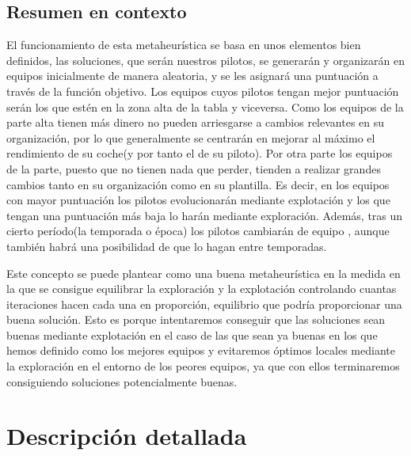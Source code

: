 \documentclass{article}
\begin{document}
	\subsection{Resumen en contexto}
	\indent El funcionamiento de esta metaheurística se basa en unos elementos bien definidos, las soluciones, que serán nuestros pilotos, se generarán y organizarán en equipos inicialmente de manera aleatoria, y se les asignará una puntuación a través de la función objetivo. Los equipos cuyos pilotos tengan mejor puntuación serán los que estén en la zona alta de la tabla y viceversa. Como los equipos de la parte alta tienen más dinero no pueden arriesgarse a cambios relevantes en su organización, por lo que generalmente se centrarán en mejorar al máximo el rendimiento de su coche(y por tanto el de su piloto). Por otra parte los equipos de la parte, puesto que no tienen nada que perder, tienden a realizar grandes cambios tanto en su organización como en su plantilla. Es decir, en los equipos con mayor puntuación los pilotos evolucionarán mediante explotación y los que tengan una puntuación más baja lo harán mediante exploración. Además, tras un cierto período(la temporada o época) los pilotos cambiarán de equipo , aunque también habrá una posibilidad de que lo hagan entre temporadas.
	\par
	Este concepto se puede plantear como una buena metaheurística en la medida en la que se consigue equilibrar la exploración y la explotación controlando cuantas iteraciones hacen cada una en proporción, equilibrio que podría proporcionar una buena solución. Esto es porque intentaremos conseguir que las soluciones sean buenas mediante explotación en el caso de las que sean ya buenas en los que hemos definido como los mejores equipos y evitaremos óptimos locales mediante la exploración en el entorno de los peores equipos, ya que con ellos terminaremos consiguiendo soluciones potencialmente buenas.
	
	\section {Descripción detallada}
\end{document}
